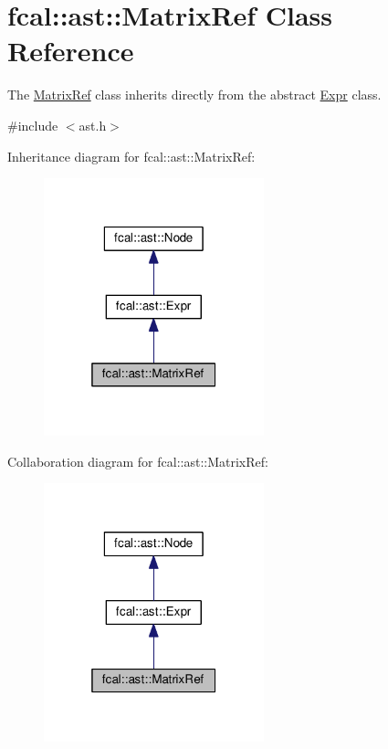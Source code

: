\hypertarget{classfcal_1_1ast_1_1MatrixRef}{}\section{fcal\+:\+:ast\+:\+:Matrix\+Ref Class Reference}
\label{classfcal_1_1ast_1_1MatrixRef}


The \hyperlink{classfcal_1_1ast_1_1MatrixRef}{Matrix\+Ref} class inherits directly from the abstract \hyperlink{classfcal_1_1ast_1_1Expr}{Expr} class.  




{\ttfamily \#include $<$ast.\+h$>$}



Inheritance diagram for fcal\+:\+:ast\+:\+:Matrix\+Ref\+:
\nopagebreak
\begin{figure}[H]
\begin{center}
\leavevmode
\includegraphics[width=181pt]{classfcal_1_1ast_1_1MatrixRef__inherit__graph}
\end{center}
\end{figure}


Collaboration diagram for fcal\+:\+:ast\+:\+:Matrix\+Ref\+:
\nopagebreak
\begin{figure}[H]
\begin{center}
\leavevmode
\includegraphics[width=181pt]{classfcal_1_1ast_1_1MatrixRef__coll__graph}
\end{center}
\end{figure}
